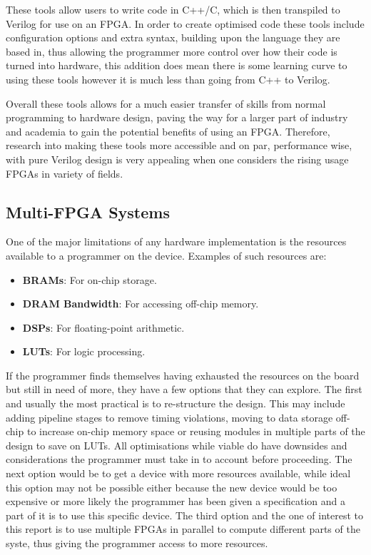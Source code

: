 These tools allow users to write code in C++/C, which is then transpiled to Verilog for use on an FPGA. In order to create optimised code these tools include configuration options and extra syntax, building upon the language they are based in, thus allowing the programmer more control over how their code is turned into hardware, this addition does mean there is some learning curve to using these tools however it is much less than going from C++ to Verilog. 

Overall these tools allows for a much easier transfer of skills from normal programming to hardware design, paving the way for a larger part of industry and academia to gain the potential benefits of using an FPGA. Therefore, research into making these tools more accessible and on par, performance wise, with pure Verilog design is very appealing when one considers the rising usage FPGAs in variety of fields\cite{fpga-market}.

\subsection{Multi-FPGA Systems}

One of the major limitations of any hardware implementation is the resources available to a programmer on the device. Examples of such resources are:

\begin{itemize}
    \item \textbf{BRAMs}: For on-chip storage.
    \item \textbf{DRAM Bandwidth}: For accessing off-chip memory.
    \item \textbf{DSPs}: For floating-point arithmetic.
    \item \textbf{LUTs}: For logic processing.
\end{itemize}

If the programmer finds themselves having exhausted the resources on the board but still in need of more, they have a few options that they can explore. The first and usually the most practical is to re-structure the design. This may include adding pipeline stages to remove timing violations, moving to data storage off-chip to increase on-chip memory space or reusing modules in multiple parts of the design to save on LUTs. All optimisations while viable do have downsides and considerations the programmer must take in to account before proceeding. The next option would be to get a device with more resources available, while ideal this option may not be possible either because the new device would be too expensive or more likely the programmer has been given a specification and a part of it is to use this specific device. The third option and the one of interest to this report is to use multiple FPGAs in parallel to compute different parts of the syste, thus giving the programmer access to more resources.

